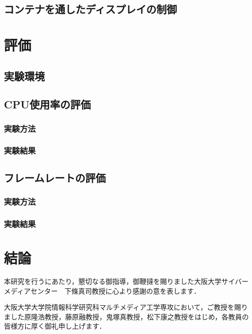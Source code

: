 \documentclass[12pt,a4paper]{jbook}
\begin{document}
\section{コンテナを通したディスプレイの制御}

\chapter{評価}

\section{実験環境}

\section{CPU使用率の評価}

\subsection{実験方法}

\subsection{実験結果}

\section{フレームレートの評価}

\subsection{実験方法}

\subsection{実験結果}

\chapter{結論}

\acknowledgement
本研究を行うにあたり，懇切なる御指導，御鞭撻を賜りました大阪大学サイバーメディアセンター　下條真司教授に心より感謝の意を表します．

大阪大学大学院情報科学研究科マルチメディア工学専攻において，ご教授を賜りました原隆浩教授，藤原融教授，鬼塚真教授，松下康之教授をはじめ，各教員の皆様方に厚く御礼申し上げます．
\end{document}
